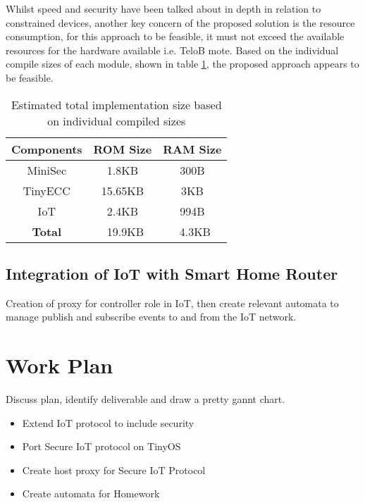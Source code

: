 \documentclass{mprop}
\begin{document}
Whilst speed and security have been talked about in depth in relation to constrained devices, another key concern of the proposed solution is the resource consumption, for this approach to be feasible, it must not exceed the available resources for the hardware available i.e. TeloB mote. Based on the individual compile sizes of each module, shown in table \ref{tab:compile_sizes}, the proposed approach appears to be feasible.
\begin{table}[h] %
  \begin{center} 
  \begin{tabular}{|c|c|c|} 
  \hline
  \textbf{Components} & \textbf{ROM Size}  & \textbf{RAM Size}\\  \hline
  MiniSec             & 1.8KB              & 300B \\     \hline
  TinyECC             & 15.65KB            & 3KB\\       \hline
  IoT                 & 2.4KB              & 994B\\      \hline 
  \textbf{Total}      & ~19.9KB            & ~4.3KB\\    \hline
  \end{tabular}
  \caption[]{Estimated total implementation size based on individual compiled sizes}
  \label{tab:compile_sizes}
  \end{center}
\end{table}


\subsection{Integration of IoT with Smart Home Router} %
\label{sub:implementation_of_iot_on_smart_home_router}
Creation of proxy for controller role in IoT, then create relevant automata to manage publish and subscribe events to and from the IoT network.
\section{Work Plan}
Discuss plan, identify deliverable and draw a pretty gannt chart.
\begin{itemize}
  \item Extend IoT protocol to include security 
  \item Port Secure IoT protocol on TinyOS
  \item Create host proxy for Secure IoT Protocol
  \item Create automata for Homework
\end{itemize}



\end{document}
